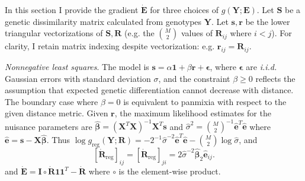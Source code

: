 \documentclass[11pt]{article}
\newcommand{\mat}[1]{\mathbf{#1}}
\begin{document}
In this section I provide the gradient $\dot{\mat E}$ for
three choices of $g(\mat Y; \mat E)$. Let $\mat S$ be a genetic
dissimilarity matrix calculated from genotypes $\mat Y$.  Let $\mat s, \mat r$ be
the lower triangular vectorizations of $\mat S, \mat R$ (e.g. the ${M \choose 2}$ values of $\mat R_{ij}$ 
where $i < j$). For clarity, I retain matrix indexing despite vectorization: e.g. $\mat r_{ij} =
\mat R_{ij}$.

\emph{Nonnegative least squares}.
The model is $\mat s =  \alpha \mat 1 + \beta \mat r + \bm \epsilon$, where
$\bm \epsilon$ are \emph{i.i.d.} Gaussian errors with standard deviation
$\sigma$, and the constraint $\beta \geq 0$ reflects the assumption that expected genetic differentiation cannot
decrease with distance. The boundary case where $\beta = 0$ is equivalent to panmixia
with respect to the given distance metric. Given $\mat r$, the
maximum likelihood estimates for the nuisance
parameters are $\hat{\bm \beta} = (\mat X^T \mat X)^{-1} \mat X^T \mat s$ and 
$\hat{\sigma}^2 = {M \choose 2}^{-1} \hat{\mat e}^T \hat{\mat e}$ where 
$\hat{\mat e} = \mat s - \mat X \hat{\bm \beta}$.  Thus
$\log g_{\mathrm{reg}}(\mat Y; \mat R) = -2^{-1} \hat{\sigma}^{-2} \hat{\mat e}^T \hat{\mat e} - {M \choose 2} \log \hat{\sigma}$, and
\[
  [\dot{\mat R}_\mathrm{reg}]_{ij} = [\dot{\mat R}_\mathrm{reg}]_{ji} = 2 \hat{\sigma}^{-2} \hat{\bm \beta}_2 \hat{\mat e}_{ij}.
\]
and $\dot{\mat E} = \mat I \circ \dot{\mat R} \mat 1 \mat 1^T - \dot{\mat R}$ where $\circ$ is the element-wise product.
\end{document}
